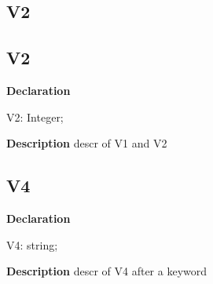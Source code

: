 \documentclass{report}
\newif\ifpdf
\begin{document}
\subsection*{\large{\textbf{V2}}\normalsize\hspace{1ex}\hrulefill}
\else
\subsection*{V2}
\fi
\label{warning_back_comment-V2}
\begin{list}{}{
\setlength{\itemindent}{0cm}
\setlength{\listparindent}{0cm}
\setlength{\leftmargin}{\evensidemargin}
\addtolength{\leftmargin}{\tmplength}
\settowidth{\labelsep}{X}
\addtolength{\leftmargin}{\labelsep}
\setlength{\labelwidth}{\tmplength}
}
\item[\textbf{Declaration}\hfill]
\ifpdf
\begin{flushleft}
\fi
\begin{ttfamily}
V2: Integer;\end{ttfamily}

\ifpdf
\end{flushleft}
\fi

\par
\item[\textbf{Description}]
descr of V1 and V2

\end{list}
\ifpdf
\subsection*{\large{\textbf{V4}}\normalsize\hspace{1ex}\hrulefill}
\else
\subsection*{V4}
\fi
\label{warning_back_comment-V4}
\begin{list}{}{
\setlength{\itemindent}{0cm}
\setlength{\listparindent}{0cm}
\setlength{\leftmargin}{\evensidemargin}
\addtolength{\leftmargin}{\tmplength}
\settowidth{\labelsep}{X}
\addtolength{\leftmargin}{\labelsep}
\setlength{\labelwidth}{\tmplength}
}
\item[\textbf{Declaration}\hfill]
\ifpdf
\begin{flushleft}
\fi
\begin{ttfamily}
V4: string;\end{ttfamily}

\ifpdf
\end{flushleft}
\fi

\par
\item[\textbf{Description}]
descr of V4 after a keyword

\end{list}
\end{document}
